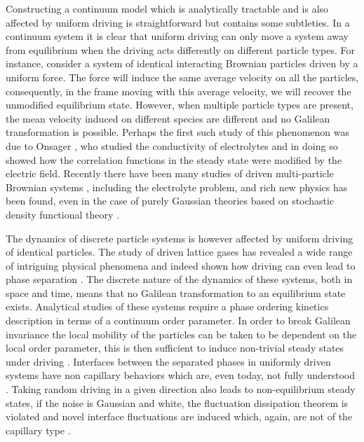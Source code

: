 Constructing a continuum model which is analytically tractable and is also affected by uniform driving is straightforward but contains some subtleties. In a continuum system it is clear that uniform driving can only move a system away from equilibrium when the driving acts differently on different particle types. For instance, consider  a system of identical interacting Brownian particles driven by a uniform  force. The force will induce the same average velocity on all the particles, consequently, in the frame moving with this average velocity, we will recover the unmodified equilibrium state. However, when multiple particle types are present, the mean velocity induced on different species are different and no Galilean transformation is possible. Perhaps the first such study of this phenomenon was due to Onsager \cite{onsager_collected_1996}, who studied the conductivity of electrolytes and in doing so showed how the correlation functions in the steady state were modified by the electric field. 
Recently there have been many studies of driven multi-particle Brownian systems \cite{dzubiella_lane_2002,chakrabarti_dynamical_2003,chakrabarti_reentrance_2004,sutterlin_dynamics_2009,glanz_nature_2012, klymko_microscopic_2016}, including the electrolyte problem,  and rich new physics has been found, even in the case of purely Gaussian theories \cite{demery_conductivity_2016,poncet_universal_2017} based on stochastic density functional theory \cite{dean_renormalization_1996}. 

The dynamics of discrete particle systems is however affected by uniform driving of identical particles. The study of driven lattice gases has revealed a wide range of intriguing physical phenomena and indeed shown how driving can even lead to phase separation \cite{katz_nonequilibrium_1984,zia_interfacial_1991,leung_anomalous_1993,schmittmann_driven_1998}. The discrete nature of the dynamics of these systems, both in space and time, means that no Galilean transformation to an equilibrium state exists. Analytical studies of these systems require a phase ordering kinetics description in terms of a continuum order parameter. In order to break Galilean invariance the local mobility of the particles can be taken to be dependent on the local order parameter, this is then sufficient to induce non-trivial steady states under driving \cite{katz_nonequilibrium_1984,leung_anomalous_1993,smith_interfaces_2008,smith_lateral_2010}. Interfaces between the separated phases in uniformly driven systems have non capillary behaviors which are, even today, not fully understood \cite{leung_anomalous_1993}.
Taking random driving in a given direction also leads to non-equilibrium steady states, if the noise is Gaussian and white, the fluctuation dissipation theorem is violated and novel interface fluctuations are induced which, again, are  not of  the capillary type \cite{zia_interfacial_1991}. 

